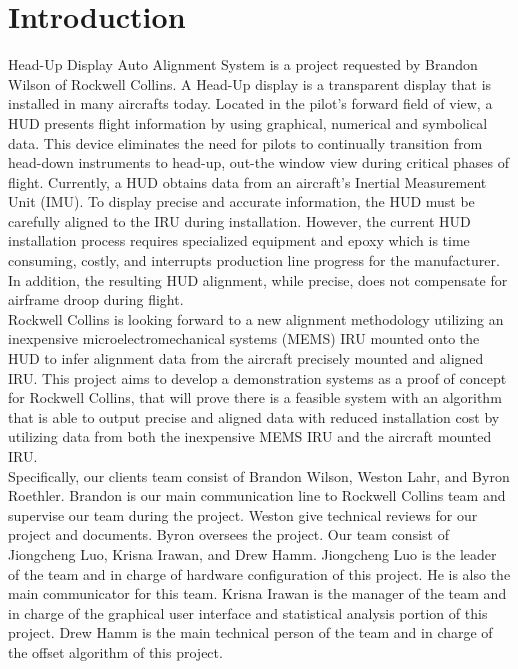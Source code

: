 \newpage
\section{Introduction}
Head-Up Display Auto Alignment System is a project requested by Brandon Wilson of Rockwell Collins. A Head-Up display is a transparent display that is installed in many aircrafts today. Located in the pilot’s forward field of view, a HUD presents flight information by using graphical, numerical and symbolical data. This device eliminates the need for pilots to continually transition from head-down instruments to head-up, out-the window view during critical phases of flight. Currently, a HUD obtains data from an aircraft’s Inertial Measurement Unit (IMU). To display precise and accurate information, the HUD must be carefully aligned to the IRU during installation. However, the current HUD installation process requires specialized equipment and epoxy which is time consuming, costly, and interrupts production line progress for the manufacturer. In addition, the resulting HUD alignment, while precise, does not compensate for airframe droop during flight. \\

Rockwell Collins is looking forward to a new alignment methodology utilizing an inexpensive microelectromechanical systems (MEMS) IRU mounted onto the HUD to infer alignment data from the aircraft precisely mounted and aligned IRU. This project aims to develop a demonstration systems as a proof of concept for Rockwell Collins, that will prove there is a feasible system with an algorithm that is able to output precise and aligned data with reduced installation cost by utilizing data from both the inexpensive MEMS IRU and the aircraft mounted IRU. \\ 

Specifically, our clients team consist of Brandon Wilson, Weston Lahr, and Byron Roethler. Brandon is our main communication line to Rockwell Collins team and supervise our team during the project. Weston give technical reviews for our project and documents. Byron oversees the project. Our team consist of Jiongcheng Luo, Krisna Irawan, and Drew Hamm. Jiongcheng Luo is the leader of the team and in charge of hardware configuration of this project. He is also the main communicator for this team. Krisna Irawan is the manager of the team and in charge of the graphical user interface and statistical analysis portion of this project. Drew Hamm is the main technical person of the team and in charge of the offset algorithm of this project.  \\